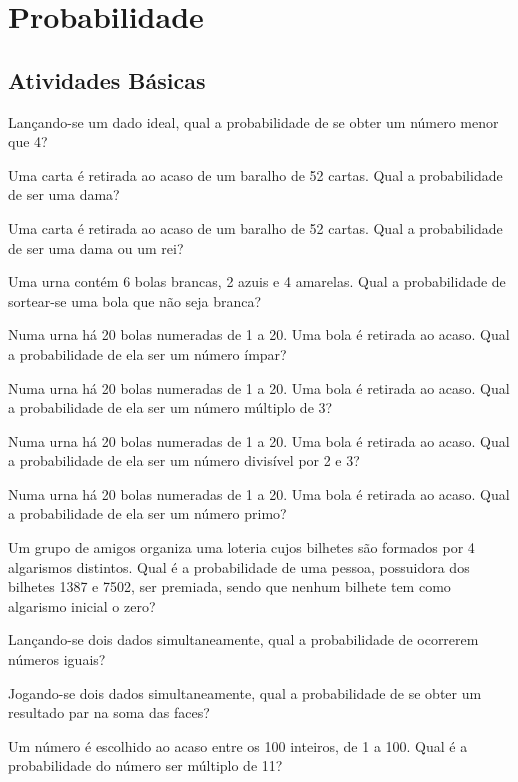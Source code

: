 \chapter{Probabilidade} 
	\section{Atividades Básicas}
		
		
		\item Lançando-se  um  dado  ideal,  qual  a  probabilidade  de  se  obter  um número menor que 4? 
		\item Uma  carta  é  retirada  ao  acaso  de  um  baralho de  52  cartas.  Qual  a probabilidade de ser uma dama? 
		\item Uma  carta  é  retirada  ao  acaso  de  um  baralho de  52  cartas.  Qual  a probabilidade de ser uma dama ou um rei? 
		\item Uma  urna  contém  6  bolas  brancas,  2  azuis  e  4  amarelas.  Qual  a probabilidade de sortear-se uma bola que não seja branca? 
		\item Numa urna há 20 bolas numeradas de 1 a 20. Uma bola é retirada ao acaso. Qual a probabilidade de ela ser um número ímpar? 
		\item Numa urna há 20 bolas numeradas de 1 a 20. Uma bola é retirada ao acaso. Qual a probabilidade de ela ser um número múltiplo de 3? 
		\item Numa urna há 20 bolas numeradas de 1 a 20. Uma bola é retirada ao acaso. Qual a probabilidade de ela ser um número divisível por 2 e 3? 
		\item Numa urna há 20 bolas numeradas de 1 a 20. Uma bola é retirada ao acaso. Qual a probabilidade de ela ser um número primo? 
		\item Um  grupo  de  amigos  organiza  uma  loteria  cujos  bilhetes  são formados  por  4  algarismos  distintos.  Qual  é  a  probabilidade  de uma  pessoa,  possuidora  dos  bilhetes  1387  e  7502,  ser  premiada, sendo que nenhum bilhete tem como algarismo inicial o zero? 
		\item Lançando-se  dois  dados  simultaneamente,  qual  a  probabilidade de ocorrerem números iguais? 
		\item Jogando-se dois dados simultaneamente, qual a probabilidade de se obter um resultado par na soma das faces? 
		\item Um número é escolhido ao acaso entre os 100 inteiros, de 1 a 100. Qual é a probabilidade do número ser múltiplo de 11? 
